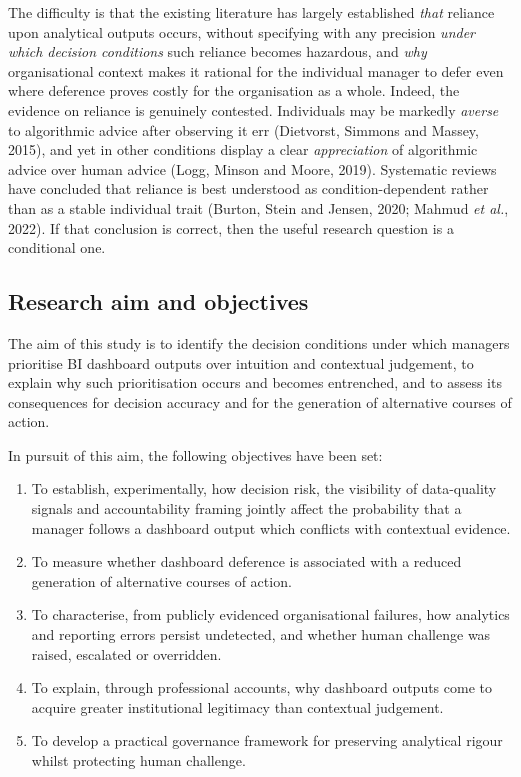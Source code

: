 \documentclass[11pt,a4paper]{article}
\numberwithin{figure}{section}
\numberwithin{table}{section}
\newcommand{\ct}[1]{\textcolor{citeblue}{#1}}          %
\begin{document}
The difficulty is that the existing literature has largely established \emph{that} reliance upon
analytical outputs occurs, without specifying with any precision \emph{under which decision
conditions} such reliance becomes hazardous, and \emph{why} organisational context makes it
rational for the individual manager to defer even where deference proves costly for the
organisation as a whole. Indeed, the evidence on reliance is genuinely contested. Individuals may
be markedly \emph{averse} to algorithmic advice after observing it err \ct{(Dietvorst, Simmons and
Massey, 2015)}, and yet in other conditions display a clear \emph{appreciation} of algorithmic
advice over human advice \ct{(Logg, Minson and Moore, 2019)}. Systematic reviews have concluded
that reliance is best understood as condition-dependent rather than as a stable individual trait
\ct{(Burton, Stein and Jensen, 2020; Mahmud \emph{et al.}, 2022)}. If that conclusion is correct,
then the useful research question is a conditional one.

\subsection{Research aim and objectives}

The aim of this study is to identify the decision conditions under which managers prioritise BI
dashboard outputs over intuition and contextual judgement, to explain why such prioritisation
occurs and becomes entrenched, and to assess its consequences for decision accuracy and for the
generation of alternative courses of action.

In pursuit of this aim, the following objectives have been set:

\begin{enumerate}[leftmargin=*,itemsep=2pt,topsep=4pt]
\item To establish, experimentally, how decision risk, the visibility of data-quality signals and
accountability framing jointly affect the probability that a manager follows a dashboard output
which conflicts with contextual evidence.
\item To measure whether dashboard deference is associated with a reduced generation of
alternative courses of action.
\item To characterise, from publicly evidenced organisational failures, how analytics and
reporting errors persist undetected, and whether human challenge was raised, escalated or
overridden.
\item To explain, through professional accounts, why dashboard outputs come to acquire greater
institutional legitimacy than contextual judgement.
\item To develop a practical governance framework for preserving analytical rigour whilst
protecting human challenge.
\end{enumerate}
\end{document}
